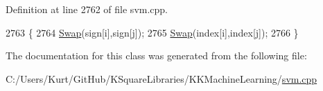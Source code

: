 Definition at line 2762 of file svm.\+cpp.


\begin{DoxyCode}
2763   \{
2764     \hyperlink{namespace_s_v_m233_aba73cf189d50b3a4379e512f9ea2a303}{Swap}(sign[i],sign[j]);
2765     \hyperlink{namespace_s_v_m233_aba73cf189d50b3a4379e512f9ea2a303}{Swap}(index[i],index[j]);
2766   \}
\end{DoxyCode}


The documentation for this class was generated from the following file\+:\begin{DoxyCompactItemize}
\item 
C\+:/\+Users/\+Kurt/\+Git\+Hub/\+K\+Square\+Libraries/\+K\+K\+Machine\+Learning/\hyperlink{svm_8cpp}{svm.\+cpp}\end{DoxyCompactItemize}
